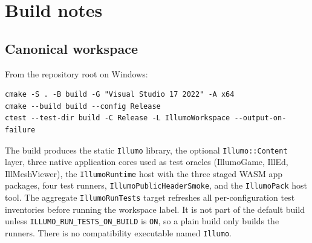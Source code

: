 \clearpage
\section{Build notes}
\label{sec:build}

\subsection{Canonical workspace}
From the repository root on Windows:
\begin{lstlisting}[language={}]
cmake -S . -B build -G "Visual Studio 17 2022" -A x64
cmake --build build --config Release
ctest --test-dir build -C Release -L IllumoWorkspace --output-on-failure
\end{lstlisting}
The build produces the static \texttt{Illumo} library,
the optional \texttt{Illumo::Content} layer, three native application cores used
as test oracles (IllumoGame, IllEd, IllMeshViewer), the
\texttt{IllumoRuntime} host with the three staged WASM app packages,
four test runners, \texttt{IllumoPublicHeaderSmoke}, and the
\texttt{IllumoPack} host tool. The aggregate
\texttt{IllumoRunTests} target refreshes all per-configuration test inventories
before running the workspace label. It is not part of the default build unless
\texttt{ILLUMO\_RUN\_TESTS\_ON\_BUILD} is \texttt{ON}, so a plain build only
builds the runners. There is no compatibility executable named
\texttt{Illumo}.

